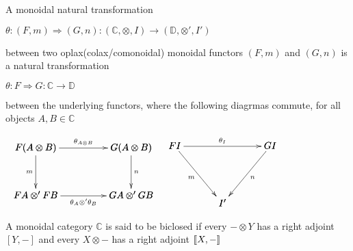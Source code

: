 \begin{definition}
\label{def:oplax_monoidal_natural_transformation}
    A monoidal natural transformation
    \begin{center}
        \begin{math}
            \theta : (F,m) \Rightarrow (G,n) : (\mathbb{C}, \otimes, I) \rightarrow (\mathbb{D}, \otimes ', I')
        \end{math}
    \end{center}
    between two oplax(colax/comonoidal) monoidal functors $(F,m)$ and $(G,n)$ is a natural transformation
    \begin{center}
        \begin{math}
            \theta : F \Rightarrow G : \mathbb{C} \rightarrow \mathbb{D}
        \end{math}
    \end{center}
    between the underlying functors, where the following diagrmas commute, for all objects $A,B \in \mathbb{C}$
    \begin{center}
        \begin{math}
            \begin{array}{rl}
                \bfig
                    \square<1000,500>[
                        F(A \otimes B)`
                        G(A \otimes B)`
                        FA \otimes ' FB`
                        GA \otimes ' GB;
                        \theta_{A \otimes B}`
                        m`
                        n`
                        \theta_A \otimes ' \theta_B
                    ]
                \efig
                &
                \bfig
                    \Vtriangle<500,600>[
                        FI`
                        GI`
                        I';
                        \theta_I`
                        m`
                        n
                    ]
                \efig
            \end{array}
        \end{math}
    \end{center}
    \cite{mellies2009}
\end{definition}


\begin{definition}
\label{def:biclosed_monoidal_category}
    A monoidal category $\mathbb{C}$ is said to be biclosed if every $- \otimes Y$ has a right adjoint $[Y,-]$ and every 
    $X \otimes -$ has a right adjoint $[\negthinspace[X,-]\negthinspace]$ \cite{kelly1982}
\end{definition}